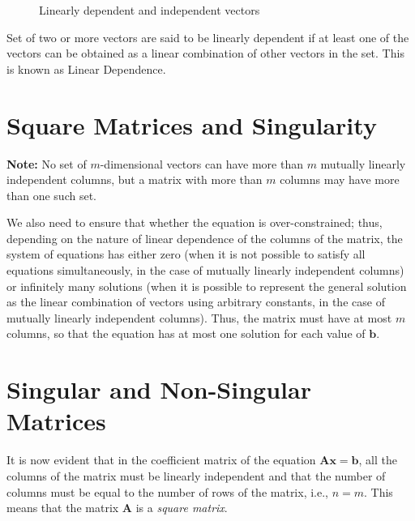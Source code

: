 \para

\begin{figure}[ht]
    \centering
    
    \caption{Linearly dependent and independent vectors}
    \label{Vectors in a 3D space}
\end{figure}

\para


Set of two or more vectors are said to be linearly dependent if at least one of the vectors can be obtained as a linear combination of other vectors in the set. This is known as Linear Dependence.

\clearpage
\newpage

\section{Square Matrices and Singularity}

\textbf{Note:} No set of \(m\)-dimensional vectors can have more than \(m\) mutually linearly independent columns, but a matrix with more than \(m\) columns may have more than one such set.

\para

We also need to ensure that whether the equation is over-constrained; thus, depending on the nature of linear dependence of the columns of the matrix, the system of equations has either zero (when it is not possible to satisfy all equations simultaneously, in the case of mutually linearly independent columns) or infinitely many solutions (when it is possible to represent the general solution as the linear combination of vectors using arbitrary constants, in the case of mutually linearly independent columns). Thus, the matrix must have at most \(m\) columns, so that the equation has at most one solution for each value of \(\mathbf{b}\).

\para

\section{Singular and Non-Singular Matrices}

It is now evident that in the coefficient matrix of the equation \(\mathbf{A}\mathbf{x} = \mathbf{b}\), all the columns of the matrix must be linearly independent and that the number of columns must be equal to the number of rows of the matrix, i.e., \(n = m\). This means that the matrix \(\mathbf{A}\) is a \textit{square matrix}.

\para

